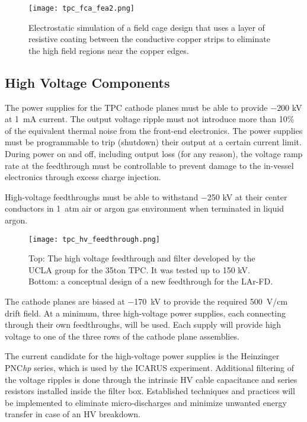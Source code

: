 \begin{figure}[htbp]
\centering
\texttt{[image: tpc\_fca\_fea2.png]}
\caption[FCA with resistive coating]{Electrostatic simulation of a field cage design that uses a layer of resistive coating between the conductive copper strips to eliminate the high field regions near the copper edges. }
\label{fig:tpc-field-cage-resistive-coating}
\end{figure}    


\subsection{High Voltage Components}
\label{subsec:v5-tpc-hv}
   
The power supplies for the TPC cathode planes 
must be able to provide $-200$ kV at 1~mA current. The output voltage ripple 
must not introduce more than 10\% of the equivalent thermal noise from the front-end electronics. 
The power supplies must be programmable to trip (shutdown) 
their output at a certain current limit.  During power on and off, 
including output loss (for any reason), the voltage ramp rate at the 
feedthrough must be controllable to prevent 
damage to the in-vessel electronics through excess charge injection.

High-voltage feedthroughs must be able to withstand $-$250 kV 
at their center conductors in 1~atm air or argon gas environment when terminated in liquid argon.


\begin{figure}[htbp]
\centering
\texttt{[image: tpc\_hv\_feedthrough.png]}
\caption[concept of new feedthrough]{Top: The high voltage feedthrough and filter developed by the UCLA 
group for the 35ton TPC.  It was tested up to 150 kV.  Bottom: a conceptual design of a new feedthrough for the LAr-FD.}
\label{fig:tpc-UCLA-feedthrough}
\end{figure}

The cathode planes are biased at $-$170~kV to provide the required 
500~V/cm drift field. At a minimum, three high-voltage power 
supplies, each connecting through their own feedthroughs, will be used. Each supply will
provide high voltage to one of the three rows of the cathode plane assemblies.

The current candidate for the high-voltage power supplies is 
the Heinzinger PNC{\it hp} series, which is used by the ICARUS 
experiment.  Additional filtering of the voltage ripples is done through the intrinsic HV cable capacitance 
and series resistors installed inside the filter box. Established techniques and practices will be implemented to eliminate 
micro-discharges and minimize unwanted energy transfer in case of an HV breakdown. 
  
